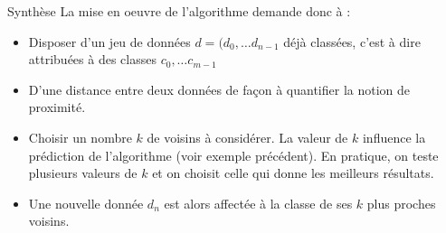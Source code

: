\documentclass[10pt]{beamer}
\begin{document}
\begin{frame}{\Ctitle}{\stitle}
    \begin{block}{Synthèse}
        La mise en oeuvre de l'algorithme demande donc à :
        \begin{itemize}
            \item<1-> Disposer d'un jeu de données $d=(d_0, \dots d_{n-1}$ déjà classées, c'est à dire attribuées à des classes $c_0, \dots c_{m-1}$
            \item<2-> D'une distance entre deux données de façon à quantifier la notion de proximité.
            \item<3-> Choisir un nombre $k$ de voisins à considérer. La valeur de $k$ influence la prédiction de l'algorithme (voir exemple précédent). En pratique, on teste plusieurs valeurs de $k$ et on choisit celle qui donne les meilleurs résultats.
            \item<4-> Une nouvelle donnée $d_n$ est alors affectée à la classe de ses $k$ plus proches voisins.
        \end{itemize}
    \end{block}
\end{frame}


\begin{frame}{\Ctitle}{\stitle}
\end{frame}
\end{document}
